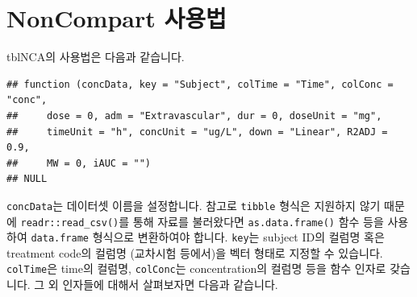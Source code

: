 \documentclass[
  10pt,
]{krantz}
\begin{document}
\hypertarget{how-to-use}{%
\section{NonCompart 사용법}\label{how-to-use}}

tblNCA의 사용법은 다음과 같습니다.

\begin{verbatim}
## function (concData, key = "Subject", colTime = "Time", colConc = "conc", 
##     dose = 0, adm = "Extravascular", dur = 0, doseUnit = "mg", 
##     timeUnit = "h", concUnit = "ug/L", down = "Linear", R2ADJ = 0.9, 
##     MW = 0, iAUC = "") 
## NULL
\end{verbatim}

\texttt{concData}는 데이터셋 이름을 설정합니다. 참고로 \texttt{tibble} 형식은 지원하지 않기 때문에
\texttt{readr::read\_csv()}를 통해 자료를 불러왔다면 \texttt{as.data.frame()} 함수 등을 사용하여 \texttt{data.frame} 형식으로 변환하여야 합니다.
\texttt{key}는 subject ID의 컬럼명 혹은 treatment code의 컬럼명 (교차시험 등에서)을 벡터 형태로 지정할 수 있습니다.
\texttt{colTime}은 time의 컬럼명, \texttt{colConc}는 concentration의 컬럼명 등을 함수 인자로 갖습니다. 그 외 인자들에 대해서 살펴보자면 다음과 같습니다.
\end{document}
